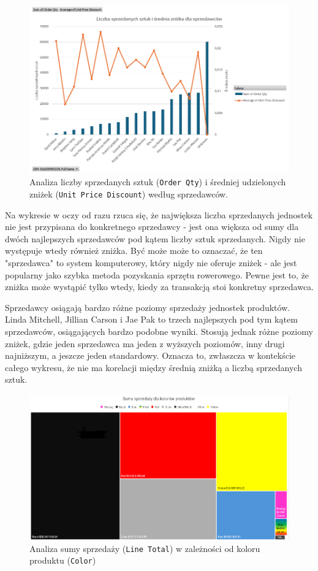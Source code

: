 \documentclass[a4paper,12pt]{article}
\begin{document}
\begin{figure}[H]
    \centering
    \includegraphics[width=1.0\textwidth]{images/7_2.png}
    \caption{Analiza liczby sprzedanych sztuk (\texttt{Order Qty}) i średniej udzielonych zniżek (\texttt{Unit Price Discount}) według sprzedawców.}
\end{figure}

Na wykresie w oczy od razu rzuca się, że największa liczba sprzedanych jednostek nie jest przypisana do konkretnego sprzedawcy - jest ona większa od sumy dla dwóch najlepszych sprzedawców pod kątem liczby sztuk sprzedanych. Nigdy nie występuje wtedy również zniżka. Być może może to oznaczać, że ten "sprzedawca" to system komputerowy, który nigdy nie oferuje zniżek - ale jest popularny jako szybka metoda pozyskania sprzętu rowerowego. Pewne jest to, że zniżka może wystąpić tylko wtedy, kiedy za transakcją stoi konkretny sprzedawca.

Sprzedawcy osiągają bardzo różne poziomy sprzedaży jednostek produktów. Linda Mitchell, Jillian Carson i Jae Pak to trzech najlepszych pod tym kątem sprzedawców, osiągających bardzo podobne wyniki. Stosują jednak różne poziomy zniżek, gdzie jeden sprzedawca ma jeden z wyższych poziomów, inny drugi najniższym, a jeszcze jeden standardowy. Oznacza to, zwłaszcza w kontekście całego wykresu, że nie ma korelacji między średnią zniżką a liczbą sprzedanych sztuk.

\begin{figure}[H]
    \centering
    \includegraphics[width=1.0\textwidth]{images/7_3.png}
    \caption{Analiza sumy sprzedaży (\texttt{Line Total}) w zależności od koloru produktu (\texttt{Color})}
\end{figure}
\end{document}
